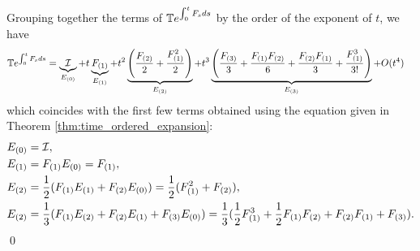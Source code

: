 \begin{example}
Grouping together the terms of $\mathbb{T} e^{\int_0^t F_s ds}$ by the order of the exponent of $t$, we have 
\begin{align*}
    \mathbb{T} e^{\int_0^t F_s ds} &= \underbrace{\mathcal{I}}_{E_{(0)}} + t \underbrace{F_{(1)}}_{E_{(1)}} + t^2 \underbrace{\left( \frac{F_{(2)}}{2} + \frac{F_{(1)}^2}{2} \right)}_{E_{(2)}} + t^3 \underbrace{\left(\frac{F_{(3)}}{3}+\frac{F_{(1)}F_{(2)}}{6} +\frac{F_{(2)}F_{(1)}}{3} + \frac{F_{(1)}^3}{3!} \right)}_{E_{(3)}} +O(t^4)
\end{align*}
which coincides with the first few terms obtained using the equation given in Theorem \ref{thm:time_ordered_expansion}:
\begin{align*}
    E_{(0)} &= \mathcal{I},\\
    E_{(1)} &= F_{(1)}E_{(0)} = F_{(1)},\\
    E_{(2)} &= \frac{1}{2}(F_{(1)}E_{(1)} +  F_{(2)}E_{(0)}) = \frac{1}{2}(F_{(1)}^2 + F_{(2)}),\\
    E_{(2)} &= \frac{1}{3}(F_{(1)}E_{(2)} +  F_{(2)}E_{(1)} + F_{(3)}E_{(0)}) = \frac{1}{3}(\frac{1}{2}F_{(1)}^3 + \frac{1}{2}F_{(1)}F_{(2)} + F_{(2)}F_{(1)} +F_{(3)}).
\end{align*}
\hfill\qed
\end{example}

